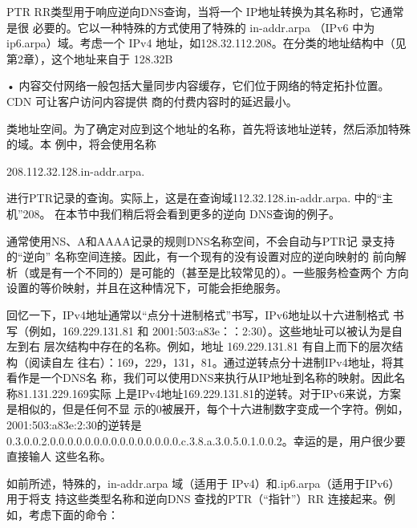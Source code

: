 PTR RR类型用于响应逆向DNS查询，当将一个 IP地址转换为其名称时，它通常是很
必要的。它以一种特殊的方式使用了特殊的 in-addr.arpa （IPv6 中为 ip6.arpa）域。考虑一个
IPv4 地址，如128.32.112.208。在分类的地址结构中（见第2章），这个地址来自于 128.32B

• 内容交付网络一般包括大量同步内容缓存，它们位于网络的特定拓扑位置。CDN 可让客户访问内容提供
商的付费内容时的延迟最小。

类地址空间。为了确定对应到这个地址的名称，首先将该地址逆转，然后添加特殊的域。本
例中，将会使用名称

208.112.32.128.in-addr.arpa.

进行PTR记录的查询。实际上，这是在查询域112.32.128.in-addr.arpa. 中的“主机”208。
在本节中我们稍后将会看到更多的逆向 DNS查询的例子。

\begin{tcolorbox}
    通常使用NS、A和AAAA记录的规则DNS名称空间，不会自动与PTR记
    录支持的“逆向” 名称空间连接。因此，有一个现有的没有设置对应的逆向映射的
    前向解析（或是有一个不同的）是可能的（甚至是比较常见的）。一些服务检查两个
    方向设置的等价映射，并且在这种情况下，可能会拒绝服务。
\end{tcolorbox}

回忆一下，IPv4地址通常以“点分十进制格式”书写，IPv6地址以十六进制格式
书写（例如，169.229.131.81 和 2001:503:a83e：：2:30）。这些地址可以被认为是自左到右
层次结构中存在的名称。例如，地址 169.229.131.81 有自上而下的层次结构（阅读自左
往右）：169，229，131，81。通过逆转点分十进制IPv4地址，将其看作是一个DNS名
称，我们可以使用DNS来执行从IP地址到名称的映射。因此名称81.131.229.169实际
上是IPv4地址169.229.131.81的逆转。对于IPv6来说，方案是相似的，但是任何不显
示的0被展开，每个十六进制数字变成一个字符。例如，2001:503:a83e:2:30的逆转是
0.3.0.0.2.0.0.0.0.0.0.0.0.0.0.0.0.0.0.0.c.3.8.a.3.0.5.0.1.0.0.2。幸运的是，用户很少要直接输人
这些名称。

如前所述，特殊的，in-addr.arpa 域（适用于 IPv4）和.ip6.arpa（适用于IPv6）用于将支
持这些类型名称和逆向DNS 查找的PTR（“指针”）RR 连接起来。例如，考虑下面的命令：

